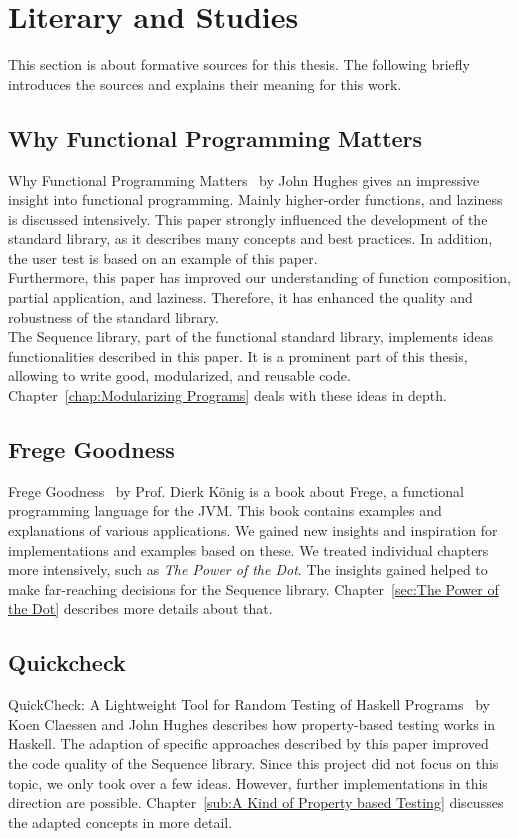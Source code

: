 \section{Literary and Studies}
\label{sec:Literary and Studies}
This section is about formative sources for this thesis. The following briefly
introduces the sources and explains their meaning for this work.

\subsection{Why Functional Programming Matters}
\label{sub:Functional Programming Matters}

Why Functional Programming Matters~\cite{hughes_why_1989} by John Hughes gives
an impressive insight into functional programming. Mainly higher-order
functions, and laziness is discussed intensively. This paper strongly
influenced the development of the standard library, as it describes many
concepts and best practices. In addition, the user test is based on an example
of this paper. \\ 
Furthermore, this paper has improved our understanding of function composition,
partial application, and laziness. Therefore, it has enhanced the quality and
robustness of the standard library. \\
The Sequence library, part of the functional standard library, implements ideas
functionalities described in this paper. It is a prominent part of this thesis,
allowing to write good, modularized, and reusable code.
Chapter~\ref{chap:Modularizing Programs} deals with these ideas in depth.


\subsection{Frege Goodness}
\label{sub:Frege Goodness}
Frege Goodness~\cite{frege_goodness} by Prof. Dierk König is a book about
Frege, a functional programming language for the JVM. This book contains
examples and explanations of various applications. We gained new insights and
inspiration for implementations and examples based on these. We treated
individual chapters more intensively, such as \textit{The Power of the Dot}.
The insights gained helped to make far-reaching decisions for the Sequence
library. Chapter~\ref{sec:The Power of the Dot} describes more details about
that.

\subsection{Quickcheck}
\label{sub:Quickcheck}
QuickCheck: A Lightweight Tool for Random Testing of Haskell
Programs~\cite{quickcheck_hughes} by Koen Claessen and John Hughes describes
how property-based testing works in Haskell. The adaption of specific
approaches described by this paper improved the code quality of the Sequence
library. Since this project did not focus on this topic, we only took over a few
ideas. However, further implementations in this direction are possible.
Chapter~\ref{sub:A Kind of Property based Testing} discusses the adapted
concepts in more detail. 

